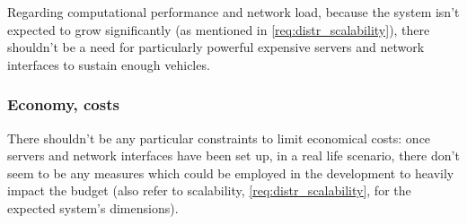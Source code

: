 Regarding computational performance and network load, because the system isn't
expected to grow significantly (as mentioned in \ref{req:distr_scalability}),
there shouldn't be a need for particularly powerful expensive servers and
network interfaces to sustain enough vehicles.

\subsubsection{Economy, costs}
There shouldn't be any particular constraints to limit economical costs: once
servers and network interfaces have been set up, in a real life scenario, there
don't seem to be any measures which could be employed in the development to
heavily impact the budget (also refer to scalability,
\ref{req:distr_scalability}, for the expected system's dimensions).
